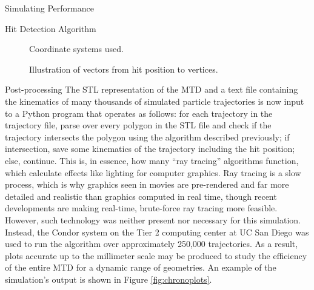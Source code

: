 \begin{section}{Simulating Performance}
\begin{subsection}{Hit Detection Algorithm}
\begin{figure}[htb]
\begin{center}

\subfloat[Original]      {

}\quad
\subfloat[Primed]      {

}

\end{center}
\caption{Coordinate systems used.}
\label{fig:setup}
\end{figure}

\begin{figure}[htb]
\begin{center}

\subfloat[Inside]      {

}\quad
\subfloat[Outside]      {

}

\end{center}
\caption{Illustration of vectors from hit position to vertices.}
\label{fig:vectors}
\end{figure}

\end{subsection}
\begin{subsection}{Post-processing}
The STL representation of the MTD and a text file containing the kinematics of many thousands of simulated particle trajectories is now input to a Python program that operates as follows: for each trajectory in the trajectory file, parse over every polygon in the STL file and check if the trajectory intersects the polygon using the algorithm described previously; if intersection, save some kinematics of the trajectory including the hit position; else, continue. This is, in essence, how many ``ray tracing'' algorithms function\cite{raytrace}, which calculate effects like lighting for computer graphics. Ray tracing is a slow process, which is why graphics seen in movies are pre-rendered and far more detailed and realistic than graphics computed in real time, though recent developments are making real-time, brute-force ray tracing more feasible. However, such technology was neither present nor necessary for this simulation. Instead, the Condor\cite{condor} system on the Tier 2 computing center at UC San Diego was used to run the algorithm over approximately 250,000 trajectories. As a result, plots accurate up to the millimeter scale may be produced to study the efficiency of the entire MTD for a dynamic range of geometries. An example of the simulation's output is shown in Figure \ref{fig:chronoplots}.


\end{subsection}
\end{section}

